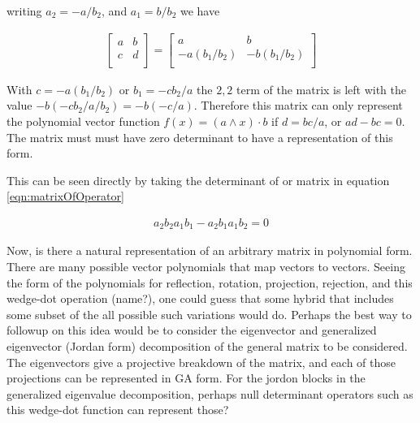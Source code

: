 \documentclass{article}
\begin{document}
writing $a_2 = -a/b_2$, and $a_1 = b/b_2$ we have

\begin{align*}
\begin{bmatrix}
a & b \\
c & d \\
\end{bmatrix}
=
\begin{bmatrix}
a & b \\
-a (b_1/b_2) & -b (b_1/b_2) \\
\end{bmatrix}
\end{align*}

With $c = -a(b_1/b_2)$ or $b_1 = -c b_2 /a$ the $2,2$ term of the matrix
is left with the value $-b (-c b_2 /a / b_2 ) = -b (-c /a )$.  Therefore 
this matrix can only represent the
polynomial vector function $f(x) = (a \wedge x) \cdot b$ if 
$d = bc/a$, or $ad - bc = 0$.  The matrix must must have zero determinant
to have a representation of this form.

This can be seen directly by taking the determinant of 
or matrix in equation \ref{eqn:matrixOfOperator}

\begin{align*}
a_2 b_2 a_1 b_1 - a_2 b_1 a_1 b_2 = 0
\end{align*}

Now, is there a natural representation of an arbitrary matrix in polynomial form.  There are many possible
vector polynomials that map vectors to vectors.  Seeing the form of the polynomials for reflection, rotation, projection, rejection, and this wedge-dot operation (name?), one could guess that some hybrid that includes some subset of the 
all possible such variations would do.  Perhaps the best way to followup on this idea would be to consider the eigenvector and generalized eigenvector (Jordan form) decomposition of the general matrix to be considered.  The eigenvectors give a projective breakdown of the matrix, and each of those projections can be represented in GA form.  For the jordon blocks in the generalized eigenvalue decomposition, perhaps null determinant operators such as this wedge-dot function can represent those?

%
%
\end{document}
